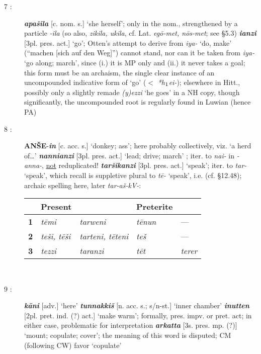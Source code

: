 \documentclass[10pt]{article}
\newcommand{\subsc}[1]{$_{\textrm{\scriptsize{#1}}}$}	%
\newcommand{\bit}[1]{\textbf{\textit{#1}}}				%
\newcommand{\p}[1]{{\tiny[{#1}]}}					%
\newcommand{\hi}{h\subsc{1}}								%
\renewcommand{\.}[1]{\textsubdot{#1}}
\begin{document}
\begin{description}
\item[7 :] \bit{apa\v{s}ila} \p{c. nom. s.} `she herself'; only in the nom., strengthened by a particle \textit{-ila} (so also, \textit{zikila, ukila}, cf. Lat. \textit{eg\=o-met, n\=os-met}; see  \S5.3) \bit{ianzi} \p{3pl. pres. act.} `go'; Otten's attempt to derive from \textit{iya-} `do, make' (``machen [sich auf den Weg]'') cannot stand, nor can it be taken from \textit{iya-} `go along; march', since (i.) it is MP only and (ii.) it never takes a goal; this form must be an archaism, the single clear instance of an uncompounded indicative form of `go' ($<$ \textit{*{\hi}ei-}); elsewhere in Hitt., possibly only a slightly remade \textit{(y)ezzi} `he goes' in a NH copy, though significantly, the uncompounded root is regularly found in Luwian (hence PA)

\item[8 :] \textbf{AN\v{S}E}-\bit{in} \p{c. acc. s.} `donkey; ass'; here probably collectively, viz. `a herd of\ldots' \bit{nannianzi} \p{3pl. pres. act.} `lead; drive; march'  ; iter. to \textit{nai-} in \textit{-anna-}, \underline{not} reduplicated! \bit{tar\v{s}ikanzi} \p{3pl. pres. act.} `speak'; iter. to \textit{tar-} `speak', which recall is suppletive plural to \textit{t\=e-} `speak', i.e. (cf.  \S12.48); archaic spelling here, later \textit{tar-a\v{s}-kV-}: \\

\begin{tabular}{|l|l|l|l|l|} \hline
{} & \textbf{Present} & {} & \textbf{Preterite} & {} \\ \hline
\textbf{1} & \textit{t\=emi} & \textit{tarweni} & \textit{t\=enun} & {---} \\
\textbf{2} & \textit{te\v{s}i, t\=e\v{s}i} & \textit{tarteni, t\=eteni} & \textit{te\v{s}} & {---} \\
\textbf{3} & \textit{tezzi} & \textit{taranzi} & \textit{t\=et} & \textit{terer} \\ \hline
\end{tabular} \\

\item[9 :] \bit{k\=ani} \p{adv.} `here' \bit{tunnakki\v{s}} \p{n. acc. s.; s/n-st.} `inner chamber' \bit{inutten} \p{2pl. pret. ind. (?) act.} `make warm'; formally, pres. impv. or pret. act; in either case, problematic for interpretation \bit{arkatta} \p{3s. pres. mp. (?)} `mount; copulate; cover'; the meaning of this word is disputed; CM (following CW) favor `copulate'


\end{description}
\end{document}
